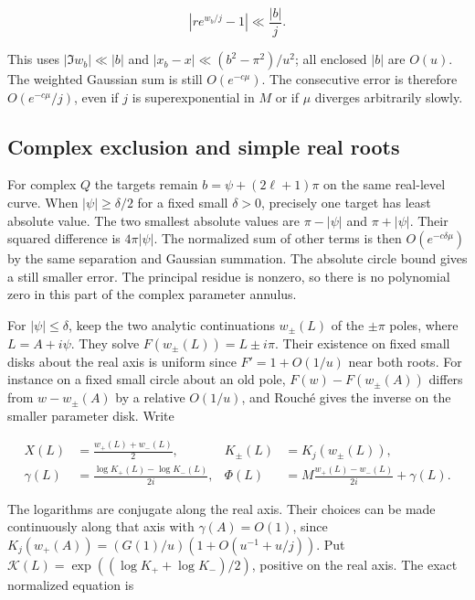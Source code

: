 \documentclass[11pt]{article}
\begin{document}
\begin{equation*}
|re^{w_b/j}-1|\ll\frac{|b|}{j}.
\end{equation*}

This uses \(|\Im w_b|\ll|b|\) and \(|x_b-x|\ll(b^2-\pi^2)/u^2\); all enclosed \(|b|\) are \(O(u)\). The weighted Gaussian sum is still \(O(e^{-c\mu})\). The consecutive error is therefore \(O(e^{-c\mu}/j)\), even if \(j\) is superexponential in \(M\) or if \(\mu\) diverges arbitrarily slowly.

\subsection{Complex exclusion and simple real roots}
\label{sec:complex-exclusion-and-simple-real-roots}

For complex \(Q\) the targets remain \(b=\psi+(2\ell+1)\pi\) on the same real-level curve. When \(|\psi|\ge\delta/2\) for a fixed small \(\delta>0\), precisely one target has least absolute value. The two smallest absolute values are \(\pi-|\psi|\) and \(\pi+|\psi|\). Their squared difference is \(4\pi|\psi|\). The normalized sum of other terms is then \(O(e^{-c\delta\mu})\) by the same separation and Gaussian summation. The absolute circle bound gives a still smaller error. The principal residue is nonzero, so there is no polynomial zero in this part of the complex parameter annulus.

For \(|\psi|\le\delta\), keep the two analytic continuations \(w_\pm(L)\) of the \(\pm\pi\) poles, where \(L=A+i\psi\). They solve \(F(w_\pm(L))=L\pm i\pi\). Their existence on fixed small disks about the real axis is uniform since \(F'=1+O(1/u)\) near both roots. For instance on a fixed small circle about an old pole, \(F(w)-F(w_\pm(A))\) differs from \(w-w_\pm(A)\) by a relative \(O(1/u)\), and Rouché gives the inverse on the smaller parameter disk. Write

\begin{equation*}
\begin{aligned}
X(L)&=\frac{w_+(L)+w_-(L)}2, &
K_\pm(L)&=K_j(w_\pm(L)),\\
\gamma(L)&=\frac{\log K_+(L)-\log K_-(L)}{2i}, &
\Phi(L)&=M\frac{w_+(L)-w_-(L)}{2i}+\gamma(L).
\end{aligned}
\end{equation*}

The logarithms are conjugate along the real axis. Their choices can be made continuously along that axis with \(\gamma(A)=O(1)\), since \(K_j(w_+(A))=(G(1)/u)(1+O(u^{-1}+u/j))\). Put \(\mathcal K(L)=\exp((\log K_++\log K_-)/2)\), positive on the real axis. The exact normalized equation is
\end{document}
